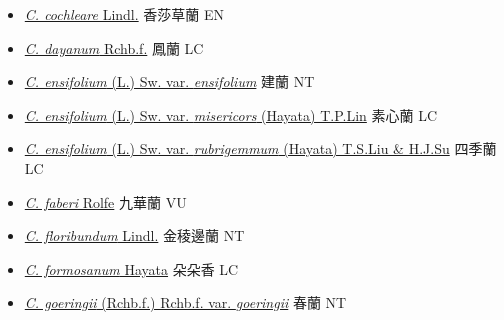 \begin{itemize}
  \begin{itemize}
        \item[] \href{http://www.theplantlist.org/tpl1.1/search?q=Cymbidium+cochleare}{\textit{C. cochleare} Lindl.}   香莎草蘭   EN
        \item[] \href{http://www.theplantlist.org/tpl1.1/search?q=Cymbidium+dayanum}{\textit{C. dayanum} Rchb.f.}   鳳蘭   LC
        \item[] \href{http://www.theplantlist.org/tpl1.1/search?q=Cymbidium+ensifolium+var.+ensifolium}{\textit{C. ensifolium} (L.) Sw. var. \textit{ensifolium}}   建蘭   NT
        \item[] \href{http://www.theplantlist.org/tpl1.1/search?q=Cymbidium+ensifolium+var.+misericors}{\textit{C. ensifolium} (L.) Sw. var. \textit{misericors} (Hayata) T.P.Lin}   素心蘭   LC
        \item[] \href{http://www.theplantlist.org/tpl1.1/search?q=Cymbidium+ensifolium+var.+rubrigemmum}{\textit{C. ensifolium} (L.) Sw. var. \textit{rubrigemmum} (Hayata) T.S.Liu \& H.J.Su}   四季蘭   LC
        \item[] \href{http://www.theplantlist.org/tpl1.1/search?q=Cymbidium+faberi}{\textit{C. faberi} Rolfe}   九華蘭   VU
        \item[] \href{http://www.theplantlist.org/tpl1.1/search?q=Cymbidium+floribundum}{\textit{C. floribundum} Lindl.}   金稜邊蘭   NT
        \item[] \href{http://www.theplantlist.org/tpl1.1/search?q=Cymbidium+formosanum}{\textit{C. formosanum} Hayata}   朵朵香   LC
        \item[] \href{http://www.theplantlist.org/tpl1.1/search?q=Cymbidium+goeringii+var.+goeringii}{\textit{C. goeringii} (Rchb.f.) Rchb.f. var. \textit{goeringii}}   春蘭   NT

\end{itemize}
\end{itemize}
